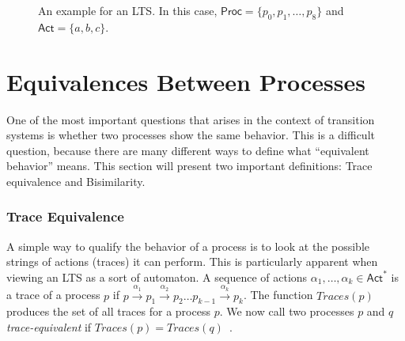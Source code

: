 \begin{figure}[tb]
\begin{center}
\end{center}
\caption{An example for an LTS\@. In this case,
    $\mathsf{Proc} = \{p_0, p_1, \ldots, p_8\}$ and
    $\mathsf{Act} = \{a, b, c\}$.
}%
\label{fig:example_lts}
\end{figure}


\section{Equivalences Between Processes}

One of the most important questions that arises in the context of transition
systems is whether two processes show the same behavior.
This is a difficult question,
because there are many different ways to define
what \enquote{equivalent behavior} means.
This section will present two important definitions: Trace equivalence and
Bisimilarity.

\subsubsection{Trace Equivalence}

A simple way to qualify the behavior of a process is to look at the possible
strings of actions (traces) it can perform.
This is particularly apparent when viewing an LTS as a sort of automaton.
A sequence of actions $\alpha_1, \ldots, \alpha_k \in \mathsf{Act}^*$
is a trace of a process $p$ if
$p \xrightarrow{\alpha_1} p_1 \xrightarrow{\alpha_2} p_2
\ldots p_{k-1} \xrightarrow{\alpha_k} p_k$.
The function $\mathit{Traces}(p)$ produces the set of all traces
for a process $p$.
We now call two processes $p$ and $q$ \emph{trace-equivalent}
if $\mathit{Traces}(p) = \mathit{Traces}(q)$~\cite{reactive_systems}.

